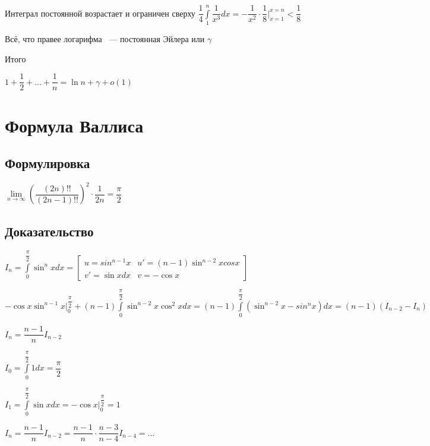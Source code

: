 \documentclass{article}
\begin{document}
        Интеграл постоянной возрастает и ограничен сверху $\dfrac{1}{4} \int\limits^n_1 \dfrac{1}{x^3} dx = -\dfrac{1}{x^2} \cdot \dfrac{1}{8} \bigg|^{x = n}_{x = 1} < \dfrac{1}{8}$
        
        Всё, что правее логарифма ~--- постоянная Эйлера или $\gamma$
        
        Итого
        
        $1 + \dfrac{1}{2} + \ldots + \dfrac{1}{n} = \ln {n} + \gamma + o(1)$
        
    \newpage
    
    \section{Формула Валлиса}
    
        \subsection{Формулировка}
        
            $\lim\limits_{n \rightarrow \infty} \left( \dfrac{(2n)!!}{(2n - 1)!!} \right)^2 \cdot \dfrac{1}{2n} = \dfrac{\pi}{2}$
            
        \subsection{Доказательство}
        
            $I_n = \int\limits^{\dfrac{\pi}{2}}_0 \sin^n x dx = \begin{bmatrix} u = sin^{n - 1} x & u' = (n - 1) \sin^{n - 2} x cos x \\ v' = \sin {x} dx & v = -\cos{x} \end{bmatrix}$
            
            $-\cos{x} \sin^{n - 1} x \bigg|^{\dfrac{\pi}{2}}_0 + (n - 1) \int\limits^{\dfrac{\pi}{2}}_0 \sin^{n - 2} x \cos^2 x dx = (n - 1) \int\limits^{\dfrac{\pi}{2}}_0 (\sin^{n - 2} x - sin^n x) dx = (n - 1) (I_{n - 2} - I_n)$
            
            $I_n = \dfrac{n - 1}{n} I_{n - 2}$
            
            $I_0 = \int\limits^{\dfrac{\pi}{2}}_0 1 dx = \dfrac{\pi}{2}$
            
            $I_1 = \int\limits^{\dfrac{\pi}{2}}_0 \sin x dx = -\cos{x} \bigg|^{\dfrac{\pi}{2}}_0 = 1$
            
            $I_n = \dfrac{n - 1}{n} I_{n - 2} = \dfrac{n - 1}{n} \cdot \dfrac{n - 3}{n - 4} I_{n - 4} = \ldots$
            
\end{document}
